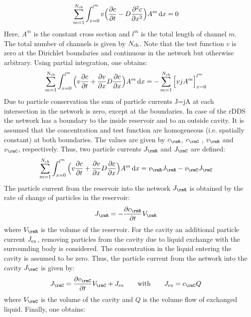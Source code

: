 \begin{align}
  \sum_{m=1}^{N_{\rm ch}} \int_{x=0}^{l^m} v \Big( \frac{\partial c}{\partial t} - D\frac{\partial^2 c}{\partial x^2} \Big) A^m \, {\rm d} x = 0
\end{align}
Here, $A^m$ is the constant cross section and $l^m$ is the total length of channel $m$. The total number of channels is given by $N_{\rm ch}$. Note that the test function $v$ is zero at the Dirichlet boundaries and continuous in the network but otherwise arbitrary. Using partial integration, one obtains:
\begin{align}
  \sum_{m=1}^{N_{\rm ch}} \int_{x=0}^{l^m}  \Big( v\frac{\partial c}{\partial t} + \frac{\partial v}{\partial x}D\frac{\partial c}{\partial x} \Big) A^m \, {\rm d} x = - \sum_{m=1}^{N_{\rm ch}} \Big[ vjA^m\Big]_{x=0}^{l^m}
\end{align}
Due to particle conservation the sum of particle currents J=jA at each intersection in the network is zero, except at the boundaries. In case of the rDDS the network has a boundary to the inside reservoir and to an outside cavity. It is assumed that the concentration and test function are homogeneous (i.e. spatially constant) at both boundaries. The values are given by $c_{\rmR}$, $c_\rmC$ , $v_\rmR$ and $v_\rmC$, respectively. Thus, two particle currents $J_\rmR$ and $J_\rmC$ are defined:
\begin{align}
  \sum_{m=1}^{N_{\rm ch}} \int_{x=0}^{l^m}  \Big( v\frac{\partial c}{\partial t} + \frac{\partial v}{\partial x}D\frac{\partial c}{\partial x} \Big) A^m \, \rmd x = v_\rmR J_\rmR - v_\rmC J_\rmC
\end{align}
The particle current from the reservoir into the network $J_\rmR$ is obtained by the rate of change of particles in the reservoir:
\begin{align}
  J_\rmR = -\frac{\partial c_\rmR}{\partial t} V_\rmR
\end{align}
where $V_\rmR$ is the volume of the reservoir. For the cavity an additional particle current $J_{\rm ex}$, removing particles from the cavity due to liquid exchange with the surrounding body is considered. The concentration in the liquid entering the cavity is assumed to be zero. Thus, the particle current from the network into the cavity $J_\rmC$ is given by:
\begin{align}
  J_\rmC = \frac{\partial c_\rmC}{\partial t} V_\rmC + J_{\rm ex} \qquad \text{with} \qquad J_{\rm ex} = c_\rmC Q
\end{align}
where $V_\rmC$ is the volume of the cavity and $Q$ is the volume flow of exchanged liquid. Finally, one obtains:
